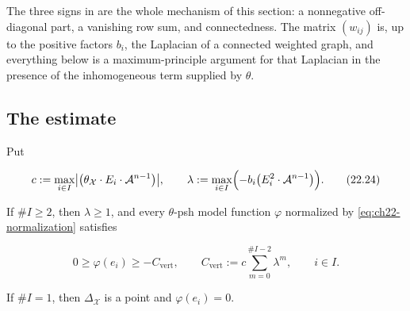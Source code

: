 The three signs in  are the whole mechanism of
this section: a nonnegative off-diagonal part, a vanishing row sum, and
connectedness.  The matrix $(w_{ij})$ is, up to the positive factors
$b_i$, the Laplacian of a connected weighted graph, and everything below is
a maximum-principle argument for that Laplacian in the presence of the
inhomogeneous term supplied by $\theta$.

\subsection{The estimate}

\begin{proposition}
\label{prop:ch22-vertex-estimate}
Put

\[
 c:=\max_{i\in I}\bigl|\bigl(\theta_{\mathcal X}\cdot E_i\cdot
       \mathcal A^{n-1}\bigr)\bigr|,
 \qquad
 \lambda:=\max_{i\in I}\Bigl(-b_i\bigl(E_i^2\cdot
       \mathcal A^{n-1}\bigr)\Bigr).
\tag{22.24}\label{eq:ch22-lambda}
\]

If $\#I\geq2$, then $\lambda\geq1$, and every $\theta$-psh model
function $\varphi$ normalized by \eqref{eq:ch22-normalization} satisfies

\[
 0\geq\varphi(e_i)\geq-C_{\mathrm{vert}},
 \qquad
 C_{\mathrm{vert}}:=c\sum_{m=0}^{\#I-2}\lambda^m,
 \qquad i\in I .
\tag{22.25}\label{eq:ch22-vertex-lower-bound}
\]

If $\#I=1$, then $\Delta_{\mathcal X}$ is a point and
$\varphi(e_i)=0$.
\end{proposition}

